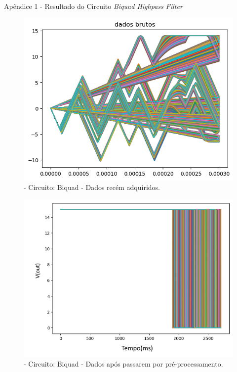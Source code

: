 


    Apêndice 1 - Resultado do Circuito \textit{Biquad Highpass Filter}
    
    
        \begin{figure}[H]
        \begin{center}
        \includegraphics[width=13cm]{./01_Pre_textuais/biquad_figs/brutos_BiquadHighpassFiltermc+4bitPRBS[FALHA]raw.png}
        \caption{\label{fig:dadoBrutoPAA}- Circuito: Biquad - Dados recém adquiridos.}
        \end{center}
        \end{figure}
        
        \begin{figure}[H]
        \begin{center}
        \includegraphics[width=13cm]{./01_Pre_textuais/biquad_figs/dadosPreProc_Biquad_Highpass_Filter_mc_+_4bitPRBS_[FALHA]raw.png}
        \caption{\label{fig:dadoPAA}- Circuito: Biquad - Dados após passarem por pré-processamento.}
        \end{center}
        \end{figure}
        
